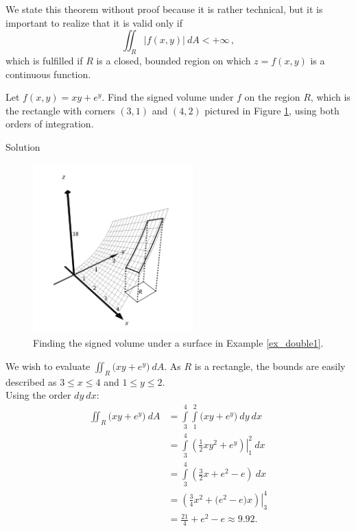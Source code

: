 \ifanalysis
We state this theorem without proof because it is rather technical, but it is important to realize that it is valid only if 
$$\iint_R \left|f(x,y)\right|\ dA<+\infty\,,$$
which is fulfilled if $R$ is a closed, bounded region on which $z=f(x,y)$ is a continuous function. 
\fi

\begin{example}\label{ex_double1}
Let $f(x,y) = xy+e^y$. Find the signed volume under $f$ on the region $R$, which is the rectangle with corners $(3,1)$ and $(4,2)$ pictured in Figure \ref{fig_double_7}, using both orders of integration.

\pagebreak
{}Solution 


\begin{figure}[H]
	\begin{center}
			\includegraphics[width=0.55\textwidth]{fig_double_7}
	\caption{Finding the signed volume under a surface in Example \ref{ex_double1}.}
	\label{fig_double_7}
	\end{center}
\end{figure}


We wish to evaluate $\iint_R \big(xy+e^y\big)\ dA$. As $R$ is a rectangle, the bounds are easily described as $3\leq x\leq 4$ and $1\leq y\leq 2$.\\

Using the order $dy\ dx$:
\begin{align*}
\iint_R\big(xy+e^y\big) \ dA &= \int\limits_3^4\int\limits_1^2\big(xy+e^y\big)\ dy \ dx \\
			&= \int\limits_3^4 \left.\left(\frac12xy^2+e^y\right)\right|_1^2\  dx \\
			&= \int\limits_3^4\left(\frac 32x + e^2-e\right)\ dx \\
			&= \left.\left(\frac 34x^2 + \big(e^2-e\big)x\right)\right|_3^4 \\
			&= \frac {21}4+ e^2-e\approx 9.92.
\end{align*}



\end{example}
